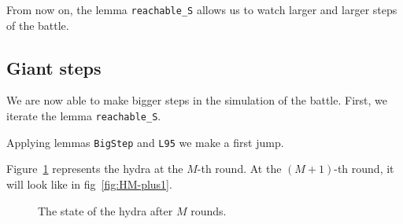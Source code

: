 From now on, the lemma \texttt{reachable\_S} allows us to watch larger and larger steps of 
the battle.







\subsection{Giant steps}

We are now able to make bigger steps in the simulation of the battle.
First, we iterate the lemma \texttt{reachable\_S}.


\vspace{4pt}



\vspace{4pt}

Applying lemmas \texttt{BigStep} and \texttt{L95} we make a first jump.

\vspace{4pt}





Figure~\ref{fig:HM}  represents the hydra at the $M$-th round.
At the $(M+1)$-th round, it will look like in fig~\ref{fig:HM-plus1}.





\begin{figure}[htb]
\centering
{}
\caption{\label{fig:HM}}
The state of the hydra after $M$ rounds.

\end{figure}


